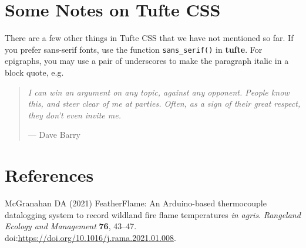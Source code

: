 \documentclass[]{tufte-book}
\begin{document}
\hypertarget{some-notes-on-tufte-css}{%
\chapter{Some Notes on Tufte CSS}\label{some-notes-on-tufte-css}}

There are a few other things in Tufte CSS that we have not mentioned so
far. If you prefer \textsf{sans-serif fonts}, use the function
\texttt{sans\_serif()} in \textbf{tufte}. For epigraphs, you may use a
pair of underscores to make the paragraph italic in a block quote, e.g.

\begin{quote}
\emph{I can win an argument on any topic, against any opponent. People
know this, and steer clear of me at parties. Often, as a sign of their
great respect, they don't even invite me.}

\hfill --- Dave Barry
\end{quote}

\hypertarget{references-2}{%
\chapter*{References}\label{references-2}}

\hypertarget{refs}{}
\leavevmode\hypertarget{ref-mcgranahan2021}{}%
McGranahan DA (2021) FeatherFlame: An Arduino-based thermocouple
datalogging system to record wildland fire flame temperatures \emph{in
agris}. \emph{Rangeland Ecology and Management} \textbf{76}, 43--47.
doi:\href{https://doi.org/https://doi.org/10.1016/j.rama.2021.01.008}{https://doi.org/10.1016/j.rama.2021.01.008}.
\end{document}
